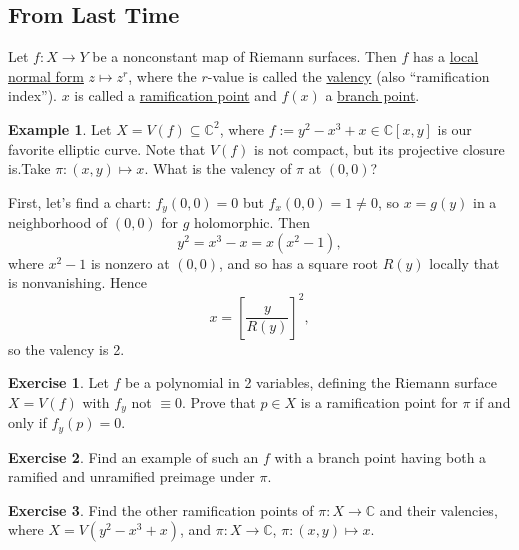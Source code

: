 \documentclass[12pt]{article}
\newcommand{\cx}{\mathbb{C}}
\theoremstyle{definition}
\newtheorem{example}[theorem]{Example}
\newtheorem{exercise}{Exercise}
\theoremstyle{remark}
\begin{document}
\subsection{From Last Time}
Let $f : X \to Y$ be a nonconstant map of Riemann surfaces. Then $f$ has a \underline{local normal form} $z \mapsto z^r$, where the $r$-value is called the \underline{valency} (also ``ramification index''). $x$ is called a \underline{ramification point} and $f(x)$ a \underline{branch point}.
\begin{example}
    Let $X = V(f) \subseteq \cx^2$, where $f := y^2 - x^3 + x \in \cx[x,y]$ is our favorite elliptic curve. Note that $V(f)$ is not compact, but its projective closure is.Take $\pi : (x,y) \mapsto x$. What is the valency of $\pi$ at $(0,0)$?
    
    First, let's find a chart: $f_y(0,0) = 0$ but $f_x(0,0) = 1 \neq 0$, so $x = g(y)$ in a neighborhood of $(0,0)$ for $g$ holomorphic. Then 
    \begin{equation}
        y^2 = x^3 - x = x(x^2 - 1),
    \end{equation}
    where $x^2 - 1$ is nonzero at $(0,0)$, and so has a square root $R(y)$ locally that is nonvanishing. Hence 
    \begin{equation}
        x = \left[ \frac{y}{R(y)} \right]^2,
    \end{equation}
    so the valency is 2.
\end{example}
\begin{exercise}
    Let $f$ be a polynomial in 2 variables, defining the Riemann surface $X = V(f)$ with $f_y$ not $\equiv 0$. Prove that $p \in X$ is a ramification point for $\pi$ if and only if $f_y(p) = 0$.
\end{exercise}
\begin{exercise}
    Find an example of such an $f$ with a branch point having both a ramified and unramified preimage under $\pi$.
\end{exercise}
\begin{exercise}
    Find the other ramification points of $\pi : X \to \cx$ and their valencies, where $X = V(y^2 - x^3 + x)$, and $\pi : X \to \cx$, $\pi : (x,y) \mapsto x$.
\end{exercise}
\end{document}
